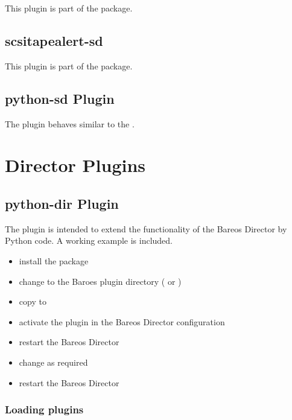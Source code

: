 This plugin is part of the  package.

\subsection{scsitapealert-sd}

This plugin is part of the  package.


\subsection{python-sd Plugin}

The  plugin behaves similar to the .


\section{Director Plugins}
\label{dirPlugins}

\subsection{python-dir Plugin}
\label{director-python-plugin}

The  plugin is intended to extend the functionality of the Bareos Director by Python code.
A working example is included.

\begin{itemize}
    \item install the  package
    \item change to the Baroes plugin directory ( or )
    \item copy  to 
    \item activate the plugin in the Bareos Director configuration
    \item restart the Bareos Director
    \item change  as required
    \item restart the Bareos Director
\end{itemize}


\subsubsection{Loading plugins}

